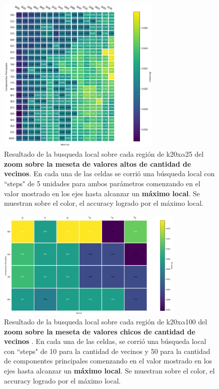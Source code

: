 \begin{figure}[h]
    \includegraphics[width=0.7\textwidth]{./img/pca_zoom1_grid.png}
    \centering
    \caption{Resultado de la busqueda local sobre cada región de k20x$\alpha$25 del \textbf{zoom sobre la meseta de valores altos de cantidad de vecinos}. En cada una de las celdas se corrió
    una búsqueda local con ``steps" de 5 unidades para ambos parámetros comenzando en el valor mostrado en los ejes
    hasta alcanzar un \textbf{máximo local}. Se muestran sobre el color, el accuracy logrado
    por el máximo local.}
    \label{fig:pca-z1}
\end{figure}

\begin{figure}[h]
    \includegraphics[width=0.8\textwidth]{./img/pca_zoom2_grid.png}
    \centering
    \caption{Resultado de la busqueda local sobre cada región de k20x$\alpha$100 del \textbf{zoom sobre la meseta de valores chicos de cantidad de vecinos} . En cada una de las celdas, se corrió
    una búsqueda local con ``steps" de 10 para la cantidad de vecinos y 50 para la cantidad de componentes principales comenzando en el valor mostrado en los ejes
    hasta alcanzar un \textbf{máximo local}. Se muestran sobre el color, el accuracy logrado
    por el máximo local.}
    \label{fig:pca-z2}
\end{figure}

